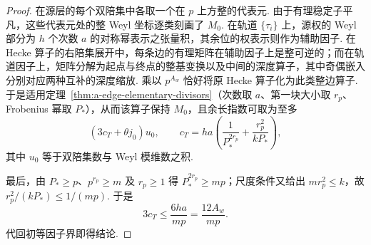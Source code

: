 \begin{proof}
在源层的每个双陪集中各取一个在 $p$ 上方整的代表元. 由于有理稳定子平凡，这些代表元处的整 Weyl 坐标逐类刻画了 $M_0$. 在轨道 $\{\tau_i\}$ 上，源权的 Weyl 部分为 $h$ 个次数 $a$ 的对称幂表示之张量积，其余位的权表示则作为辅助因子. 在 Hecke 算子的右陪集展开中，每条边的有理矩阵在辅助因子上是整可逆的；而在轨道因子上，矩阵分解为起点与终点的整基变换以及中间的深度算子，其中奇偶嵌入分别对应两种互补的深度缩放. 乘以 $p^{A_w}$ 恰好将原 Hecke 算子化为此类整边算子. 于是适用定理~\ref{thm:a-edge-elementary-divisors}（次数取 $a$、第一块大小取 $r_p$、Frobenius 幂取 $P_*$），从而该算子保持 $M_0$，且余长指数可取为至多
\[
 (3c_T+\theta j_0)u_0,\qquad
 c_T=h a\left(\frac{1}{P_*^{2r_p}}+\frac{r_p^2}{kP_*}\right),
\]
其中 $u_0$ 等于双陪集数与 Weyl 模维数之积.

最后，由 $P_*\ge p$、$p^{r_p}\ge m$ 及 $r_p\ge1$ 得 $P_*^{2r_p}\ge mp$；尺度条件又给出 $mr_p^2\le k$，故 $r_p^2/(kP_*)\le1/(mp)$. 于是
\[
 3c_T\le \frac{6ha}{mp}=\frac{12A_w}{mp}.
\]
代回初等因子界即得结论.
\end{proof}

